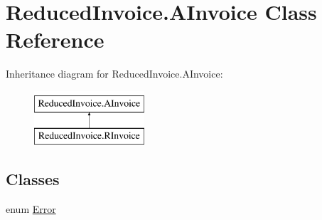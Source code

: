 \hypertarget{class_reduced_invoice_1_1_a_invoice}{}\section{Reduced\+Invoice.\+A\+Invoice Class Reference}
\label{class_reduced_invoice_1_1_a_invoice}
Inheritance diagram for Reduced\+Invoice.\+A\+Invoice\+:\begin{figure}[H]
\begin{center}
\leavevmode
\includegraphics[height=2.000000cm]{class_reduced_invoice_1_1_a_invoice}
\end{center}
\end{figure}
\subsection*{Classes}
\begin{DoxyCompactItemize}
\item 
enum \hyperlink{enum_reduced_invoice_1_1_a_invoice_1_1_error}{Error}
\end{DoxyCompactItemize}
